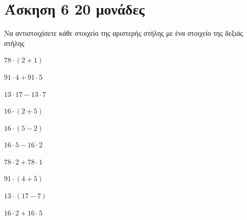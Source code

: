\documentclass[a4paper,10pt]{report}
\begin{document}
\section*{Άσκηση 6  \hfill \small{} 20 μονάδες}
Να αντιστοιχίσετε κάθε στοιχείο της αριστερής στήλης με ένα στοιχείο της δεξιάς στήλης
\begin{itemize}
\begin{multicols}{2}
 \item $78\cdot (2+1)$
 \item $91\cdot4+91\cdot 5$
 \item $13\cdot17-13\cdot7$
 \item $16\cdot(2+5)$
 \item $16\cdot(5-2)$
 \item $16\cdot 5-16\cdot2$
 \item $78\cdot 2+78\cdot1$
 \item $91\cdot(4+5)$
 \item $13\cdot(17-7)$
 \item $16\cdot2+16\cdot5$
\end{multicols}
\end{itemize}




 









\end{document}
